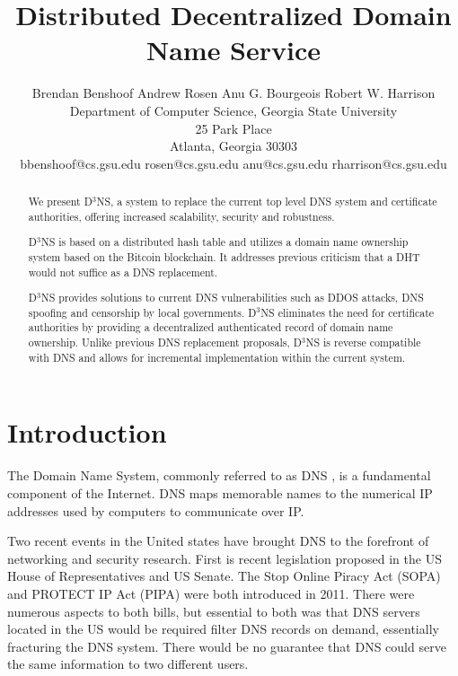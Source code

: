 \documentclass[11pt]{IEEEtran} %
\title{Distributed Decentralized Domain Name Service}
\author{
Brendan Benshoof \qquad Andrew Rosen  \qquad Anu G. Bourgeois \qquad Robert W. Harrison \\Department of Computer Science, Georgia State University\\ 25 Park Place\\ Atlanta, Georgia 30303\\  bbenshoof@cs.gsu.edu \qquad rosen@cs.gsu.edu  \qquad anu@cs.gsu.edu   \qquad rharrison@cs.gsu.edu }
\begin{document}
\maketitle

\begin{abstract}

We present D$^{3}$NS, a system to replace the current top level DNS system and certificate authorities, offering increased scalability, security and robustness. 

D$^{3}$NS is based on a distributed hash table and utilizes a domain name ownership system based on the Bitcoin blockchain.  It addresses previous criticism that a DHT would not suffice as a DNS replacement. 

D$^{3}$NS provides solutions to current DNS vulnerabilities such as DDOS attacks, DNS spoofing and censorship by local governments. D$^{3}$NS eliminates the need for certificate authorities by providing a decentralized authenticated record of domain name ownership. Unlike previous DNS replacement proposals, D$^{3}$NS is reverse compatible with DNS and allows for incremental implementation within the current system.





\end{abstract}


\section{Introduction}
The Domain Name System, commonly referred to as DNS \cite{mockapetris2003rfc} \cite{mockapetris2004rfc}, is a fundamental component of the Internet.  DNS maps memorable names to the numerical IP addresses used by computers to communicate over IP. 

Two recent events in the United states have brought DNS to the forefront of networking and security research.  First is recent legislation proposed in the US House of Representatives and US Senate. The Stop Online Piracy Act (SOPA) \cite{sopa} and PROTECT IP Act (PIPA) \cite{pipa} were both introduced in 2011.  There were numerous aspects to both bills, but essential to both was that DNS servers located in the US would be required filter DNS records on demand, essentially fracturing the DNS system.  There would be no guarantee that DNS could serve the same information to two different users.
\end{document}
